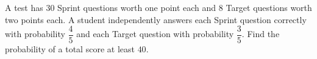 A test has 30 Sprint questions worth one point each and 8 Target questions worth two points each. A student independently answers each Sprint question correctly with probability $\dfrac{4}{5}$ and each Target question with probability $\dfrac{3}{5}$. Find the probability of a total score at least $ 40 $.
